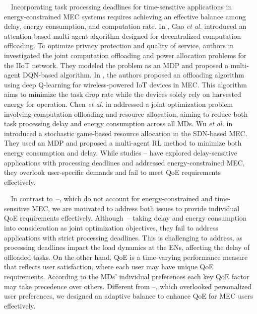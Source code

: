 \documentclass[12pt,draftclsnofoot,onecolumn]{IEEEtran}
\newenvironment{my}[2]%
{\begin{list}{}%
{\setlength{\rightmargin}{#1}\setlength{\leftmargin}{#2}}%


 \item[]{}

} {\end{list}}
\begin{document}
\begin{enumerate}
\begin{my}{1cm}{1cm}
{		\,\,\,\,
		Incorporating task processing deadlines for time-sensitive applications in energy-constrained MEC systems requires achieving an effective balance among delay, energy consumption, and computation rate. 
		In \cite{gao2022large}, Gao \textit{et al.} introduced an attention-based multi-agent algorithm designed for decentralized computation offloading.
		To optimize privacy protection and quality of service, authors in \cite{wu2024privacy} investigated the joint computation offloading and power allocation problems for the IIoT network. They modeled the problem as an MDP and proposed a multi-agent DQN-based algorithm. 
		In \cite{Bolourian-WCL24}, the authors proposed an offloading algorithm using deep Q-learning for wireless-powered IoT devices in MEC. This algorithm aims to minimize the task drop rate while the devices solely rely on harvested energy for operation. 
		Chen \textit{et al.} in \cite{chen2021drl} addressed a joint optimization problem involving computation offloading and resource allocation, aiming to reduce both task processing delay and energy consumption across all MDs.
		Wu \textit{et al.} in \cite{wu2023computation} introduced a stochastic game-based resource allocation in the SDN-based MEC. They used an MDP and proposed a multi-agent RL method to minimize both energy consumption and delay. While studies \cite{gao2022large}--\cite{wu2023computation} have explored delay-sensitive applications with processing deadlines and addressed energy-constrained MEC, they overlook user-specific demands and fail to meet QoE requirements effectively.\vspace{2mm}
		
		
		
		\,\,\,\,
		In contrast to~\cite{zhang2023offline}--\cite{huang2021deadline}, which do not account for energy-constrained and time-sensitive MEC, we are motivated to address both issues to provide individual QoE requirements effectively. 
		Although~\cite{liao2023online}--\cite{she2024efficient} taking delay and energy consumption into consideration as joint optimization objectives, they fail to address applications with strict processing deadlines. This is challenging to address, as processing deadlines impact the load dynamics at the ENs, affecting the delay of offloaded tasks.  
		On the other hand, QoE is a time-varying performance measure that reflects user satisfaction, where each user may have unique QoE requirements. According to the MDs' individual preferences each key QoE factor may take precedence over others. Different from \cite{gao2022large}--\cite{wu2023computation}, which overlooked personalized user preferences, we designed an adaptive balance to enhance QoE for MEC users effectively. \vspace{2mm}
		
}
\end{my}
\end{enumerate}
\end{document}
